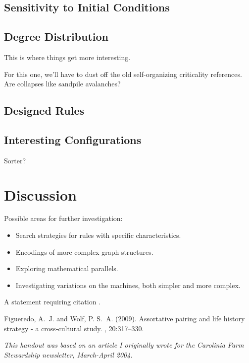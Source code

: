 \documentclass{tufte-handout}
\begin{document}
\subsection{Sensitivity to Initial Conditions}

\subsection{Degree Distribution}

This is where things get more interesting.

For this one, we'll have to dust off the old self-organizing criticality
references. Are collapses like sandpile avalanches?

\subsection{Designed Rules}

\subsection{Interesting Configurations}
Sorter?


\section{Discussion}

Possible areas for further investigation:

\begin{itemize}
    \item Search strategies for rules with specific characteristics.
    \item Encodings of more complex graph structures.
    \item Exploring mathematical parallels.
    \item Investigating variations on the machines, both simpler and more complex.
\end{itemize}

A statement requiring citation \cite{Figueredo:2009dg}.


\begin{thebibliography}{99} %

Figueredo, A.~J. and Wolf, P. S.~A. (2009).
\newblock Assortative pairing and life history strategy - a cross-cultural
  study.
, 20:317--330.
 
\end{thebibliography}

\vspace{1cm}

\emph{This handout was based on an article I originally wrote for the Carolinia Farm Stewardship newsletter, March-April 2004.}
\end{document}
